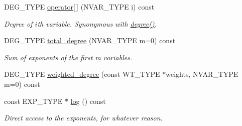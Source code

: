 \begin{Indent}
\begin{DoxyCompactItemize}
D\+E\+G\+\_\+\+T\+Y\+PE \hyperlink{group__polygroup_ab3c18ba0fe7442e07d630bddea3469b5}{operator\mbox{[}$\,$\mbox{]}} (N\+V\+A\+R\+\_\+\+T\+Y\+PE i) const
\begin{DoxyCompactList}\small\item\em Degree of $i$th variable. Synonymous with \hyperlink{group__polygroup_a817508c95fe721c56c78d91975b8416b}{degree()}. \end{DoxyCompactList}\item 
D\+E\+G\+\_\+\+T\+Y\+PE \hyperlink{group__polygroup_afe6df62857d9f58634d5f6c668f12d35}{total\+\_\+degree} (N\+V\+A\+R\+\_\+\+T\+Y\+PE m=0) const
\begin{DoxyCompactList}\small\item\em Sum of exponents of the first {\ttfamily m} variables. \end{DoxyCompactList}\item 
D\+E\+G\+\_\+\+T\+Y\+PE \hyperlink{group__polygroup_a5b19863967dc9801997d2d1058f312a3}{weighted\+\_\+degree} (const W\+T\+\_\+\+T\+Y\+PE $\ast$weights, N\+V\+A\+R\+\_\+\+T\+Y\+PE m=0) const
\item 
\mbox{\label{group__polygroup_a6b5a0acb65334373ed437045f9835a61}} 
const E\+X\+P\+\_\+\+T\+Y\+PE $\ast$ \hyperlink{group__polygroup_a6b5a0acb65334373ed437045f9835a61}{log} () const
\begin{DoxyCompactList}\small\item\em Direct access to the exponents, for whatever reason. \end{DoxyCompactList}\end{DoxyCompactItemize}
\end{Indent}
